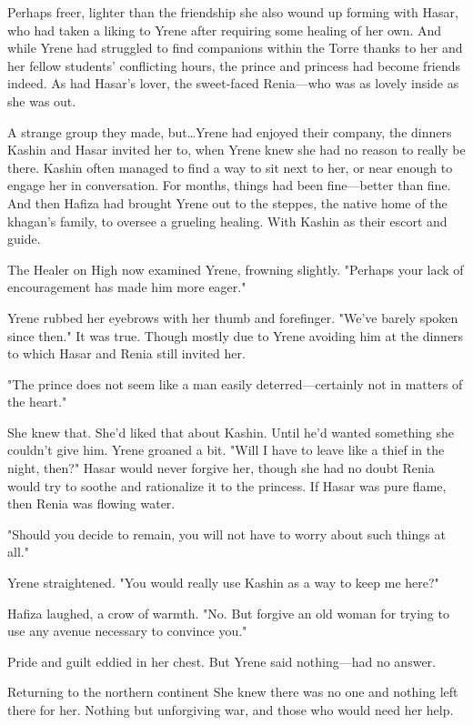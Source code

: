 Perhaps freer, lighter than the friendship she also wound up forming with Hasar, who had taken a liking to Yrene after requiring some healing of her own. And while Yrene had struggled to find companions within the Torre thanks to her and her fellow students' conflicting hours, the prince and princess had become friends indeed. As had Hasar's lover, the sweet-faced Renia---who was as lovely inside as she was out.

A strange group they made, but\ldots Yrene had enjoyed their company, the dinners Kashin and Hasar invited her to, when Yrene knew she had no reason to really be there. Kashin often managed to find a way to sit next to her, or near enough to engage her in conversation. For months, things had been fine---better than fine. And then Hafiza had brought Yrene out to the steppes, the native home of the khagan's family, to oversee a grueling healing. With Kashin as their escort and guide.

The Healer on High now examined Yrene, frowning slightly. "Perhaps your lack of encouragement has made him more eager."

Yrene rubbed her eyebrows with her thumb and forefinger. "We've barely spoken since then." It was true. Though mostly due to Yrene avoiding him at the dinners to which Hasar and Renia still invited her.

"The prince does not seem like a man easily deterred---certainly not in matters of the heart."

She knew that. She'd liked that about Kashin. Until he'd wanted something she couldn't give him. Yrene groaned a bit. "Will I have to leave like a thief in the night, then?" Hasar would never forgive her, though she had no doubt Renia would try to soothe and rationalize it to the princess. If Hasar was pure flame, then Renia was flowing water.

"Should you decide to remain, you will not have to worry about such things at all."

Yrene straightened. "You would really use Kashin as a way to keep me here?"

Hafiza laughed, a crow of warmth. "No. But forgive an old woman for trying to use any avenue necessary to convince you."

Pride and guilt eddied in her chest. But Yrene said nothing---had no answer.

Returning to the northern continent  She knew there was no one and nothing left there for her. Nothing but unforgiving war, and those who would need her help.

